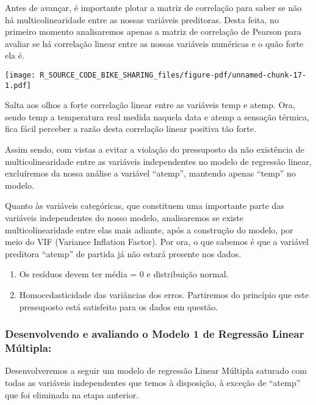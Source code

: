 \documentclass[
  letterpaper,
  DIV=11,
  numbers=noendperiod]{scrartcl}
\begin{document}
Antes de avançar, é importante plotar a matriz de correlação para saber
se não há multicolinearidade entre as nossas variáveis preditoras. Desta
feita, no primeiro momento analisaremos apenas a matriz de correlação de
Pearson para avaliar se há correlação linear entre as nossas variáveis
numéricas e o quão forte ela é.

\begin{center}
\texttt{[image: R\_SOURCE\_CODE\_BIKE\_SHARING\_files/figure-pdf/unnamed-chunk-17-1.pdf]}
\end{center}

Salta aos olhos a forte correlação linear entre as variáveis temp e
atemp. Ora, sendo temp a temperatura real medida naquela data e atemp a
sensação térmica, fica fácil perceber a razão desta correlação linear
positiva tão forte.

Assim sendo, com vistas a evitar a violação do pressuposto da não
existência de multicolinearidade entre as variáveis independentes no
modelo de regressão linear, excluíremos da nossa análise a variável
``atemp'', mantendo apenas ``temp'' no modelo.

Quanto às variáveis categóricas, que constituem uma importante parte das
variáveis independentes do nosso modelo, analisaremos se existe
multicolinearidade entre elas mais adiante, após a construção do modelo,
por meio do VIF (Variance Inflation Factor). Por ora, o que sabemos é
que a variável preditora ``atemp'' de partida já não estará presente nos
dados.

\begin{enumerate}
\def\labelenumi{\arabic{enumi})}
\setcounter{enumi}{1}
\item
  Os resíduos devem ter média = 0 e distribuição normal.
\item
  Homocedasticidade das variâncias dos erros. Partiremos do princípio
  que este pressuposto está satisfeito para os dados em questão.
\end{enumerate}

\subsubsection{\texorpdfstring{\textbf{Desenvolvendo e avaliando o
Modelo 1 de Regressão Linear
Múltipla:}}{Desenvolvendo e avaliando o Modelo 1 de Regressão Linear Múltipla:}}\label{desenvolvendo-e-avaliando-o-modelo-1-de-regressuxe3o-linear-muxfaltipla}

Desenvolveremos a seguir um modelo de regressão Linear Múltipla saturado
com todas as variáveis independentes que temos à disposição, à exceção
de ``atemp'' que foi eliminada na etapa anterior.
\end{document}
